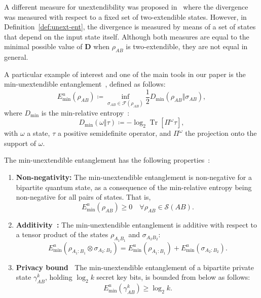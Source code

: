 \documentclass[twocolumn,letterpaper, dvipsnames,allowtoday, accepted = 2025-12-31]{quantumarticle}
\begin{document}
A different measure for unextendibility was proposed in~\cite{KDWW19, KDWW21} where the divergence was measured with respect to a fixed set of two-extendible states. However, in Definition~\ref{def:unext-ent}, the divergence is measured by means of a set of states that depend on the input state itself. Although both measures are equal to the minimal possible value of $\mathbf{D}$ when $\rho_{AB}$ is two-extendible, they are not equal in general.

A particular example of interest and one of the main tools in our paper is the min-unextendible entanglement~\cite{WWW21}, defined as follows:
\begin{equation}
    E^u_{\operatorname{min}}\!\left(\rho_{AB}\right) \coloneqq \inf_{\sigma_{AB}\in \mathcal{F}\left(\rho_{AB}\right)}\frac{1}{2} D_{\min}\!\left(\rho_{AB}\Vert\sigma_{AB}\right),
\end{equation}
where $D_{\min}$ is the min-relative entropy~\cite[Def.~2]{Dat09}:
\begin{equation}\label{eq:D_min_proj_eq}
    D_{\min}\!\left(\omega\Vert\tau\right) \coloneqq  -\log_2\operatorname{Tr}\!\left[\Pi^{\omega}\tau\right],
\end{equation}
with $\omega$ a state, $\tau$ a positive semidefinite operator, and $\Pi^{\omega}$ the projection onto the support of $\omega$.

The min-unextendible entanglement has the following properties~\cite{WWW21}:
\begin{enumerate}
    \item \textbf{Non-negativity:} The min-unextendible entanglement is non-negative for a bipartite quantum state, as a consequence of the min-relative entropy being non-negative for all pairs of states. That is,
    \begin{equation}
        E^u_{\min}\!\left(\rho_{AB}\right) \ge 0 \quad \forall \rho_{AB}\in \mathcal{S}\!\left(AB\right).
        \label{eq:min-unext-non-neg}
    \end{equation}
    \item \textbf{Additivity~\cite[Prop.~15]{WWW21}:} The min-unextendible entanglement is additive with respect to a tensor product of the states $\rho_{A_1B_1}$ and $\sigma_{A_2 B_2}$:
    \begin{equation}
        E^u_{\operatorname{min}}\!\left(\rho_{A_1:B_1}\otimes \sigma_{A_2:B_2}\right) = E^u_{\operatorname{min}}\!\left(\rho_{A_1:B_1}\right) + E^u_{\operatorname{min}}\!\left(\sigma_{A_2:B_2}\right).
        \label{eq:min-unext-additive}
    \end{equation}
    \item \textbf{Privacy bound~\cite[Prop.~21]{WWW21}} The min-unextendible entanglement of a bipartite private state $\gamma^k_{AB}$, holding $\log_2 k$ secret key bits, is bounded from below as follows:
    \begin{equation}
        E^u_{\min}\!\left(\gamma^k_{AB}\right) \ge \log_2 k.
    \end{equation}
\end{enumerate}
\end{document}
